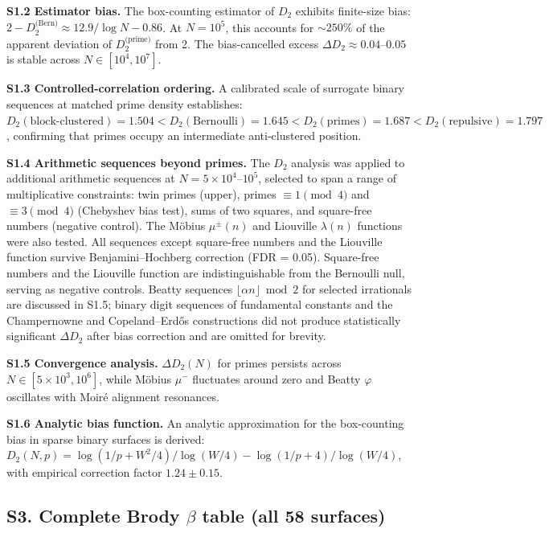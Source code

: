 \documentclass[final,3p,times,twocolumn]{elsarticle}
\theoremstyle{definition}
\begin{document}
\textbf{S1.2 Estimator bias.} The box-counting estimator of $D_2$ exhibits
finite-size bias: $2 - D_2^{\text{(Bern)}} \approx 12.9/\log N - 0.86$.
At $N=10^5$, this accounts for $\sim 250\%$ of the apparent deviation
of $D_2^{\text{(prime)}}$ from 2. The bias-cancelled excess
$\Delta D_2 \approx 0.04$--$0.05$ is stable across
$N \in [10^4, 10^7]$.

\textbf{S1.3 Controlled-correlation ordering.} A calibrated scale of
surrogate binary sequences at matched prime density establishes:
$D_2(\text{block-clustered}) = 1.504 < D_2(\text{Bernoulli}) = 1.645 <
D_2(\text{primes}) = 1.687 < D_2(\text{repulsive}) = 1.797$, confirming
that primes occupy an intermediate anti-clustered position.

\textbf{S1.4 Arithmetic sequences beyond primes.} The $D_2$
analysis was applied to additional arithmetic sequences at
$N = 5\times10^4$--$10^5$, selected to span a range of
multiplicative constraints: twin primes (upper), primes
$\equiv 1 \pmod 4$ and $\equiv 3 \pmod 4$ (Chebyshev bias test),
sums of two squares, and square-free numbers (negative control).
The M\"obius $\mu^\pm(n)$ and Liouville $\lambda(n)$ functions
were also tested. All sequences except square-free numbers and
the Liouville function survive Benjamini--Hochberg correction
(FDR = 0.05). Square-free numbers and the Liouville function are
indistinguishable from the Bernoulli null, serving as negative
controls. Beatty sequences $\lfloor\alpha n\rfloor \bmod 2$ for
selected irrationals are discussed in S1.5; binary digit sequences
of fundamental constants and the Champernowne and Copeland--Erd\H{o}s
constructions did not produce statistically significant
$\Delta D_2$ after bias correction and are omitted for brevity.

\textbf{S1.5 Convergence analysis.} $\Delta D_2(N)$ for primes persists
across $N \in [5\times10^3, 10^6]$, while M\"obius $\mu^-$ fluctuates
around zero and Beatty $\varphi$ oscillates with Moir\'e alignment
resonances.

\textbf{S1.6 Analytic bias function.} An analytic approximation for the
box-counting bias in sparse binary surfaces is derived:
$D_2(N,p) = \log(1/p + W^2/4) / \log(W/4) - \log(1/p+4) / \log(W/4)$,
with empirical correction factor $1.24 \pm 0.15$.

\subsection*{S3. Complete Brody $\beta$ table (all 58 surfaces)}
\end{document}
